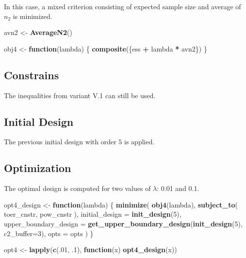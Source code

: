 \documentclass[]{book}
\newenvironment{Shaded}{\begin{snugshade}}{\end{snugshade}}
\newcommand{\ControlFlowTok}[1]{\textcolor[rgb]{0.13,0.29,0.53}{\textbf{#1}}}
\newcommand{\DataTypeTok}[1]{\textcolor[rgb]{0.13,0.29,0.53}{#1}}
\newcommand{\DecValTok}[1]{\textcolor[rgb]{0.00,0.00,0.81}{#1}}
\newcommand{\FloatTok}[1]{\textcolor[rgb]{0.00,0.00,0.81}{#1}}
\newcommand{\KeywordTok}[1]{\textcolor[rgb]{0.13,0.29,0.53}{\textbf{#1}}}
\newcommand{\NormalTok}[1]{#1}
\newcommand{\OperatorTok}[1]{\textcolor[rgb]{0.81,0.36,0.00}{\textbf{#1}}}
\newcommand{\StringTok}[1]{\textcolor[rgb]{0.31,0.60,0.02}{#1}}
\begin{document}
In this case, a mixed criterion consisting of expected sample size and
average of \(n_2\) is minimized.

\begin{Shaded}
\begin{Highlighting}[]
\NormalTok{avn2 <-}\StringTok{ }\KeywordTok{AverageN2}\NormalTok{()}

\NormalTok{obj4 <-}\StringTok{ }\ControlFlowTok{function}\NormalTok{(lambda) \{}
  \KeywordTok{composite}\NormalTok{(\{ess }\OperatorTok{+}\StringTok{ }\NormalTok{lambda }\OperatorTok{*}\StringTok{ }\NormalTok{avn2\})}
\NormalTok{\}}
\end{Highlighting}
\end{Shaded}

\hypertarget{constrains-13}{%
\subsection{Constrains}\label{constrains-13}}

The inequalities from variant V.1 can still be used.

\hypertarget{initial-design-11}{%
\subsection{Initial Design}\label{initial-design-11}}

The previous initial design with order \(5\) is applied.

\hypertarget{optimization-12}{%
\subsection{Optimization}\label{optimization-12}}

The optimal design is computed for two values of \(\lambda\): 0.01 and 0.1.

\begin{Shaded}
\begin{Highlighting}[]
\NormalTok{opt4_design <-}\StringTok{ }\ControlFlowTok{function}\NormalTok{(lambda) \{}
    \KeywordTok{minimize}\NormalTok{(}
        \KeywordTok{obj4}\NormalTok{(lambda),}
        \KeywordTok{subject_to}\NormalTok{(}
\NormalTok{            toer_cnstr,}
\NormalTok{            pow_cnstr}
\NormalTok{        ),}
        \DataTypeTok{initial_design =} \KeywordTok{init_design}\NormalTok{(}\DecValTok{5}\NormalTok{),}
        \DataTypeTok{upper_boundary_design =} \KeywordTok{get_upper_boundary_design}\NormalTok{(}\KeywordTok{init_design}\NormalTok{(}\DecValTok{5}\NormalTok{), }\DataTypeTok{c2_buffer=}\DecValTok{3}\NormalTok{),}
        \DataTypeTok{opts =}\NormalTok{ opts}
\NormalTok{    )}
\NormalTok{\}}

\NormalTok{opt4 <-}\StringTok{ }\KeywordTok{lapply}\NormalTok{(}\KeywordTok{c}\NormalTok{(.}\DecValTok{01}\NormalTok{, }\FloatTok{.1}\NormalTok{), }\ControlFlowTok{function}\NormalTok{(x) }\KeywordTok{opt4_design}\NormalTok{(x))}
\end{Highlighting}
\end{Shaded}
\end{document}
